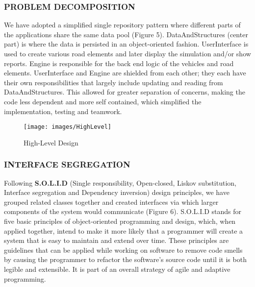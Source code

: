 \documentclass[11pt,a4paper]{article}
\begin{document}
  	\subsubsection{PROBLEM DECOMPOSITION}
  	We have adopted a simplified single repository pattern where different parts of the applications share the same data pool (Figure 5). DataAndStructures (center part) is where the data is persisted in an
  object-oriented fashion. UserInterface is used to create various road elements and later
  display the simulation and/or show reports. Engine is responsible for the back end logic of the vehicles and road
  elements. UserInterface and Engine are shielded from each other; they
  each have their own responsibilities that largely include updating
  and reading from DataAndStructures. This allowed for greater
  separation of concerns, making the code less dependent and more self
  contained, which simplified the implementation, testing and teamwork.

  	
		\begin{figure}[h]
			\texttt{[image: images/HighLevel]}
			\caption{High-Level Design}
			\centering
		\end{figure}
  
  \subsubsection{INTERFACE SEGREGATION}
  Following \textbf{S.O.L.I.D} (Single responsibility, Open-closed,
  Liskov substitution, Interface segregation and Dependency inversion)\cite{wikiOOD}
  design principles, we have grouped related classes together and
  created interfaces via which larger components of the system would
  communicate (Figure 6). S.O.L.I.D stands for five basic principles of object-oriented
  programming and design, which, when applied together, intend to make
  it more likely that a programmer will create a system that is easy to
  maintain and extend over time. These principles are guidelines
  that can be applied while working on software to remove code smells
  by causing the programmer to refactor the software's source code
  until it is both legible and extensible. It is part of an overall
  strategy of agile and adaptive programming.\cite{robert03}
  
\end{document}
